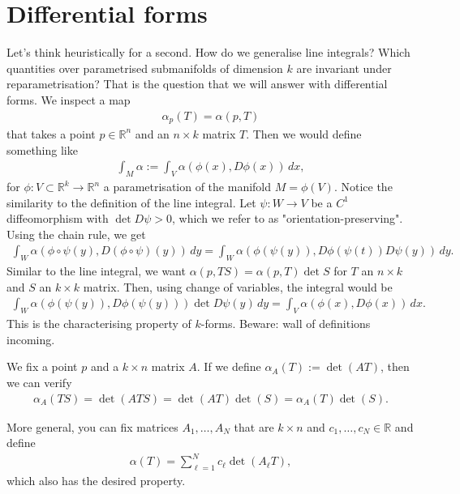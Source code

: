 \section{Differential forms}

Let's think heuristically for a second. How do we generalise line integrals? Which quantities over parametrised submanifolds of dimension $k$ are invariant under reparametrisation? That is the question that we will answer with differential forms. We inspect a map
\begin{align*}
	\alpha_{p}(T) = \alpha (p, T)
\end{align*}
that takes a point $p \in \mathbb{R}^{n}$ and an $n \times k$ matrix $T$. Then we would define something like
\begin{align*}
	\int_{M} \alpha := \int_{V} \alpha ( \phi(x), D\phi(x) ) \, dx,
\end{align*}
for $\phi: V \subset \mathbb{R}^{k} \to \mathbb{R}^{n}$ a parametrisation of the manifold $M = \phi(V)$. Notice the similarity to the definition of the line integral. Let $\psi: W \to V$ be a $C^{1}$ diffeomorphism with $\det D \psi > 0$, which we refer to as "orientation-preserving". Using the chain rule, we get
\begin{align*}
	\int_{W} \alpha (\phi \circ \psi(y), D (\phi \circ \psi)(y)) \, dy = \int_{W} \alpha (\phi(\psi(y)), D \phi(\psi(t)) D \psi(y)) \, dy.
\end{align*}
Similar to the line integral, we want $\alpha (p, T S) = \alpha (p,T) \det S$ for $T$ an $n \times k$ and $S$ an $k \times k$ matrix. Then, using change of variables, the integral would be
\begin{align*}
	\int_{W} \alpha (\phi(\psi(y)), D \phi(\psi(y))) \det D \psi(y) \, dy = \int_{V} \alpha ( \phi(x), D\phi(x)) \, dx.
\end{align*}
This is the characterising property of $k$-forms. Beware: wall of definitions incoming.

\begin{eg}
	We fix a point $p$ and a $k \times n$ matrix $A$. If we define $\alpha_{A}(T) := \det (AT)$, then we can verify
	\begin{align*}
		\alpha_{A}(TS) = \det (ATS) = \det (AT) \det (S) = \alpha_{A}(T) \det (S).
	\end{align*}

	More general, you can fix matrices $A_{1}, \dots, A_{N}$ that are $k \times n$ and $c_{1}, \dots, c_{N} \in \mathbb{R}$ and define
	\begin{align*}
		\alpha (T) = \sum_{\ell=1}^{N} c_{\ell} \det (A_{\ell}T),
	\end{align*}
	which also has the desired property.
\end{eg}

